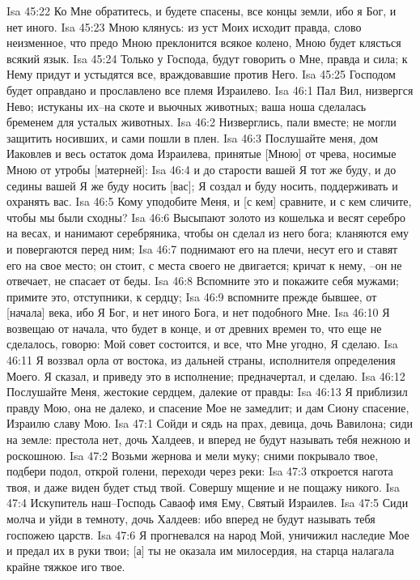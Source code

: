 Isa 45:22  Ко Мне обратитесь, и будете спасены, все концы земли, ибо я Бог, и нет иного.
Isa 45:23  Мною клянусь: из уст Моих исходит правда, слово неизменное, что предо Мною преклонится всякое колено, Мною будет клясться всякий язык.
Isa 45:24  Только у Господа, будут говорить о Мне, правда и сила; к Нему придут и устыдятся все, враждовавшие против Него.
Isa 45:25  Господом будет оправдано и прославлено все племя Израилево.
Isa 46:1  Пал Вил, низвергся Нево; истуканы их--на скоте и вьючных животных; ваша ноша сделалась бременем для усталых животных.
Isa 46:2  Низверглись, пали вместе; не могли защитить носивших, и сами пошли в плен.
Isa 46:3  Послушайте меня, дом Иаковлев и весь остаток дома Израилева, принятые [Мною] от чрева, носимые Мною от утробы [матерней]:
Isa 46:4  и до старости вашей Я тот же буду, и до седины вашей Я же буду носить [вас]; Я создал и буду носить, поддерживать и охранять вас.
Isa 46:5  Кому уподобите Меня, и [с кем] сравните, и с кем сличите, чтобы мы были сходны?
Isa 46:6  Высыпают золото из кошелька и весят серебро на весах, и нанимают серебряника, чтобы он сделал из него бога; кланяются ему и повергаются перед ним;
Isa 46:7  поднимают его на плечи, несут его и ставят его на свое место; он стоит, с места своего не двигается; кричат к нему, --он не отвечает, не спасает от беды.
Isa 46:8  Вспомните это и покажите себя мужами; примите это, отступники, к сердцу;
Isa 46:9  вспомните прежде бывшее, от [начала] века, ибо Я Бог, и нет иного Бога, и нет подобного Мне.
Isa 46:10  Я возвещаю от начала, что будет в конце, и от древних времен то, что еще не сделалось, говорю: Мой совет состоится, и все, что Мне угодно, Я сделаю.
Isa 46:11  Я воззвал орла от востока, из дальней страны, исполнителя определения Моего. Я сказал, и приведу это в исполнение; предначертал, и сделаю.
Isa 46:12  Послушайте Меня, жестокие сердцем, далекие от правды:
Isa 46:13  Я приблизил правду Мою, она не далеко, и спасение Мое не замедлит; и дам Сиону спасение, Израилю славу Мою.
Isa 47:1  Сойди и сядь на прах, девица, дочь Вавилона; сиди на земле: престола нет, дочь Халдеев, и вперед не будут называть тебя нежною и роскошною.
Isa 47:2  Возьми жернова и мели муку; сними покрывало твое, подбери подол, открой голени, переходи через реки:
Isa 47:3  откроется нагота твоя, и даже виден будет стыд твой. Совершу мщение и не пощажу никого.
Isa 47:4  Искупитель наш--Господь Саваоф имя Ему, Святый Израилев.
Isa 47:5  Сиди молча и уйди в темноту, дочь Халдеев: ибо вперед не будут называть тебя госпожею царств.
Isa 47:6  Я прогневался на народ Мой, уничижил наследие Мое и предал их в руки твои; [а] ты не оказала им милосердия, на старца налагала крайне тяжкое иго твое.
